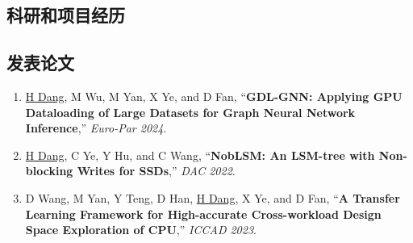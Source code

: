 \documentclass[a4paper,10pt]{ctexart} %
\begin{document}

\begin{keepsection}
\section{科研和项目经历}

\subsection{发表论文}
    \begin{enumerate}
        \item \underline{H Dang}, M Wu, M Yan, X Ye, and D Fan, ``\textbf{GDL-GNN: Applying GPU Dataloading of Large Datasets for Graph Neural Network Inference},'' \textit{Euro-Par 2024}.
        \item \underline{H Dang}, C Ye, Y Hu, and C Wang, ``\textbf{NobLSM: An LSM-tree with Non-blocking Writes for SSDs},'' \textit{DAC 2022}.
        \item D Wang, M Yan, Y Teng, D Han, \underline{H Dang}, X Ye, and D Fan, ``\textbf{A Transfer Learning Framework for High-accurate Cross-workload Design Space Exploration of CPU},'' \textit{ICCAD 2023}.
    \end{enumerate}
\end{keepsection}
\end{document}
